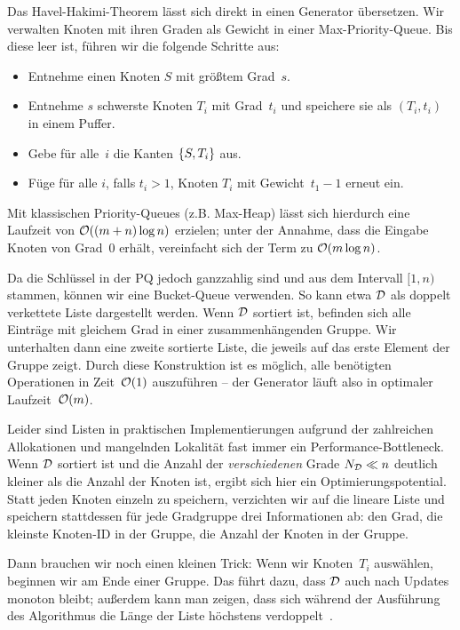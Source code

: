 Das Havel-Hakimi-Theorem lässt sich direkt in einen Generator übersetzen.
Wir verwalten Knoten mit ihren Graden als Gewicht in einer Max-Priority-Queue.
Bis diese leer ist, führen wir die folgende Schritte aus:
\begin{itemize}
    \item Entnehme einen Knoten $S$ mit größtem Grad~$s$.
    \item Entnehme $s$ schwerste Knoten $T_i$ mit Grad~$t_i$ und speichere sie als $(T_i, t_i)$ in einem Puffer.
    \item Gebe für alle~$i$ die Kanten $\left\{S, T_i\right\}$ aus.
    \item Füge für alle $i$, falls $t_i > 1$, Knoten $T_i$ mit Gewicht~$t_1 - 1$ erneut ein.
\end{itemize}

Mit klassischen Priority-Queues (z.B. Max-Heap) lässt sich hierdurch eine Laufzeit von $\mathcal{O}\!\left((m + n) \log n\right)$ erzielen;
unter der Annahme, dass die Eingabe Knoten von Grad~0 erhält, vereinfacht sich der Term zu $\mathcal{O}\!\left(m \log n\right)$.

Da die Schlüssel in der PQ jedoch ganzzahlig sind und aus dem Intervall $[1, n)$ stammen, können wir eine Bucket-Queue verwenden.
So kann etwa $\mathcal{D}$ als doppelt verkettete Liste dargestellt werden.
Wenn $\mathcal{D}$ sortiert ist, befinden sich alle Einträge mit gleichem Grad in einer zusammenhängenden Gruppe.
Wir unterhalten dann eine zweite sortierte Liste, die jeweils auf das erste Element der Gruppe zeigt.
Durch diese Konstruktion ist es möglich, alle benötigten Operationen in Zeit~$\mathcal{O}\!\left(1\right)$ auszuführen -- der Generator läuft also in optimaler Laufzeit~$\mathcal{O}\!\left(m\right)$.

Leider sind Listen in praktischen Implementierungen aufgrund der zahlreichen Allokationen und mangelnden Lokalität fast immer ein Performance-Bottleneck.
Wenn $\mathcal{D}$ sortiert ist und die Anzahl der \emph{verschiedenen} Grade $N_{\mathcal{D}} \ll n$ deutlich kleiner als die Anzahl der Knoten ist, ergibt sich hier ein Optimierungspotential.
Statt jeden Knoten einzeln zu speichern, verzichten wir auf die  lineare Liste und speichern stattdessen für jede Gradgruppe drei Informationen ab:
den Grad, die kleinste Knoten-ID in der Gruppe, die Anzahl der Knoten in der Gruppe.

Dann brauchen wir noch einen kleinen Trick: Wenn wir Knoten~$T_i$ auswählen, beginnen wir am Ende einer Gruppe.
Das führt dazu, dass $\mathcal{D}$ auch nach Updates monoton bleibt; außerdem kann man zeigen, dass sich während der Ausführung des Algorithmus die Länge der Liste höchstens verdoppelt~\cite{DBLP:journals/jea/HamannMPTW18}.

